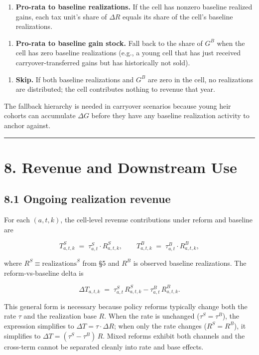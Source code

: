 \documentclass[11pt]{article}
\begin{document}
\begin{enumerate}
  \item \textbf{Pro-rata to baseline realizations.} If the cell has nonzero baseline
    realized gains, each tax unit's share of $\Delta R$ equals its share of
    the cell's baseline realizations.
\end{enumerate}
\begin{enumerate}
  \item \textbf{Pro-rata to baseline gain stock.} Fall back to the share of $G^B$
    when the cell has zero baseline realizations (e.g., a young cell that
    has just received carryover-transferred gains but has historically not
    sold).
\end{enumerate}
\begin{enumerate}
  \item \textbf{Skip.} If both baseline realizations and $G^B$ are zero in the cell,
    no realizations are distributed; the cell contributes nothing to revenue
    that year.
\end{enumerate}

The fallback hierarchy is needed in carryover scenarios because young heir cohorts can accumulate $\Delta G$ before they have any baseline realization activity to anchor against.

\par\medskip\hrule\medskip

\section*{8. Revenue and Downstream Use}

\subsection*{8.1 Ongoing realization revenue}

For each $(a, t, k)$, the cell-level revenue contributions under reform and baseline are

\[
T^S_{a, t, k} \;=\; \tau^S_{a, t} \cdot R^S_{a, t, k},
\qquad
T^B_{a, t, k} \;=\; \tau^B_{a, t} \cdot R^B_{a, t, k},
\]

where $R^S \equiv \text{realizations}^S$ from §5 and $R^B$ is observed baseline realizations. The reform-vs-baseline delta is

\[
\boxed{
\Delta T_{a, t, k}
\;=\;
\tau^S_{a, t}\,R^S_{a, t, k} - \tau^B_{a, t}\,R^B_{a, t, k}.
}
\]

This general form is necessary because policy reforms typically change both the rate $\tau$ and the realization base $R$. When the rate is unchanged ($\tau^S = \tau^B$), the expression simplifies to $\Delta T =
\tau \cdot \Delta R$; when only the rate changes ($R^S = R^B$), it simplifies to $\Delta T = (\tau^S - \tau^B)\,R$. Mixed reforms exhibit both channels and the cross-term cannot be separated cleanly into rate and base effects.
\end{document}
